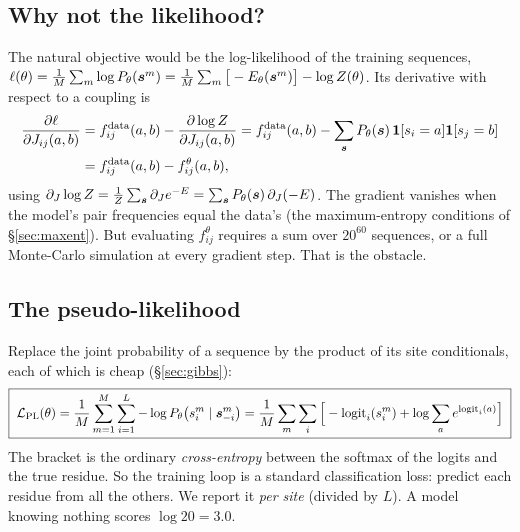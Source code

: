 \subsection{Why not the likelihood?}
The natural objective would be the log-likelihood of the training sequences,
$\ell(\theta)=\frac1M\sum_m\log P_\theta(\bm{s}^m)=\frac1M\sum_m\big[-E_\theta(\bm{s}^m)\big]-\log Z(\theta)$.
Its derivative with respect to a coupling is
\begin{align*}
\frac{\partial\ell}{\partial J_{ij}(a,b)} &= f^{\text{data}}_{ij}(a,b) - \frac{\partial\log Z}{\partial J_{ij}(a,b)}
= f^{\text{data}}_{ij}(a,b) - \sum_{\bm{s}}P_\theta(\bm{s})\,\mathbf{1}[s_i=a]\mathbf{1}[s_j=b]\\
&= f^{\text{data}}_{ij}(a,b) - f^{\theta}_{ij}(a,b),
\end{align*}
using $\partial_J\log Z=\frac1Z\sum_{\bm{s}}\partial_Je^{-E}=\sum_{\bm{s}}P_\theta(\bm{s})\,\partial_J(-E)$. The gradient
vanishes when the model's pair frequencies equal the data's (the maximum-entropy conditions of
\S\ref{sec:maxent}). But evaluating $f^\theta_{ij}$ requires a sum over $20^{60}$ sequences, or a full
Monte-Carlo simulation at every gradient step. That is the obstacle.

\subsection{The pseudo-likelihood}
Replace the joint probability of a sequence by the product of its site conditionals, each of which is
cheap (\S\ref{sec:gibbs}):
\begin{equation}\label{eq:pl}
\boxed{\;\mathcal L_{\text{PL}}(\theta)=\frac1M\sum_{m=1}^M\sum_{i=1}^L-\log P_\theta\big(s^m_i\mid\bm{s}^m_{-i}\big)
=\frac1M\sum_m\sum_i\Big[-\text{logit}_i(s^m_i)+\log\sum_{a}e^{\text{logit}_i(a)}\Big]\;}
\end{equation}
The bracket is the ordinary \emph{cross-entropy} between the softmax of the logits and the true residue.
So the training loop is a standard classification loss: predict each residue from all the others.
We report it \emph{per site} (divided by $L$). A model knowing nothing scores $\log20=3.0$.

